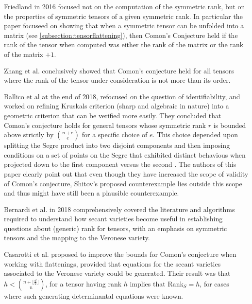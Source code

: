 \documentclass[12pt,a4paper,oneside]{book}
\def\srank{\text{Rank}_S} %
\theoremstyle{definition}
\begin{document}
Friedland \cite{friedland_remarks_2016} in 2016 focused not on the computation of the symmetric rank, but on the properties of symmetric tensors of a given symmetric rank. In particular the paper focuseed on showing that when a symmetric tensor can be unfolded into a matrix (see \cref{subsection:tensorflattening}), then Comon's Conjecture held if the rank of the tensor when computed was either the rank of the matrix or the rank of the matrix $+1$. 

Zhang et al. \cite{zhang_comons_2016} conclusively showed that Comon's conjecture held for all tensors where the rank of the tensor under consideration is not more than its order.


Ballico et al \cite{ballico_bounds_2018} at the end of 2018, refocused on the question of identifiability, and worked on refining Kruskals criterion (sharp and algebraic in nature) into a geometric criterion that can be verified more easily. They concluded that Comon's conjecture holds for general tensors whose symmetric rank $r$ is bounded above strictly by $\binom{n+e}{e}$ for a specific choice of $e$. This choice depended upon splitting the Segre product into two disjoint components and then imposing conditions on a set of points on the Segre that exhibited distinct behavious when projected down to the first component versus the second . The authors of this paper clearly point out that even though they have increased the scope of validity of Comon's conjecture, Shitov's proposed counterexample \cite{shitov_counterexample_2018} lies outside this scope and thus might have still been a plausible counterexample.

Bernardi et al. \cite{bernardi_hitchhiker_2018} in 2018 comprehensively covered the literature and algorithms required to understand how secant varieties become useful in establishing questions about (generic) rank for tensors, with an emphasis on symmetric tensors and the mapping to the Veronese variety.

Casarotti et al. \cite{casarotti_comons_2018} proposed to improve the bounds for Comon's conjecture when working with flattenings, provided that equations for the secant varieties associated to the Veronese variety could be generated. Their result was that $h < \binom{n + \lfloor \frac{d}{2} \rfloor}{n}$, for a tensor having rank $h$ implies that $\srank = h$, for cases where such generating determinantal equations were known.
\end{document}
